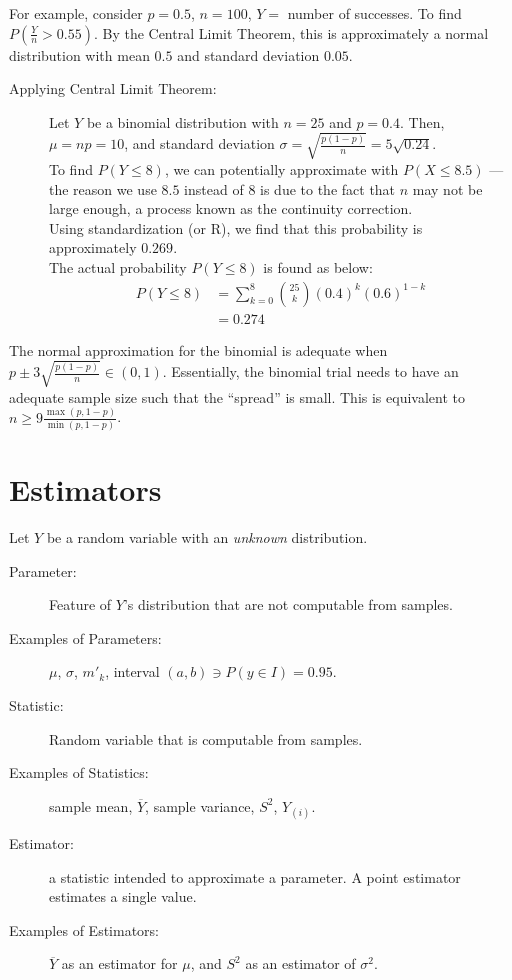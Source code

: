 \documentclass[10pt]{extarticle}
\begin{document}
    For example, consider $p=0.5$, $n=100$, $Y = $ number of successes. To find $P\left(\frac{Y}{n} > 0.55\right)$. By the Central Limit Theorem, this is approximately a normal distribution with mean $0.5$ and standard deviation $0.05$.
    \begin{description}
      \item[Applying Central Limit Theorem:] Let $Y$ be a binomial distribution with $n=25$ and $p=0.4$. Then, $\mu = np = 10$, and standard deviation $\sigma = \sqrt{\frac{p(1-p)}{n}} = 5\sqrt{0.24}$.\\

        To find $P(Y\leq 8)$, we can potentially approximate with $P(X\leq 8.5)$ --- the reason we use $8.5$ instead of $8$ is due to the fact that $n$ may not be large enough, a process known as the continuity correction.\\

        Using standardization (or R), we find that this probability is approximately $0.269$.\\

        The actual probability $P(Y\leq 8)$ is found as below:
        \begin{align*}
          P(Y\leq 8) &= \sum_{k=0}^{8} {25\choose k}(0.4)^k(0.6)^{1-k}\\
                     &= 0.274
        \end{align*}
    \end{description}
    The normal approximation for the binomial is adequate when $p \pm 3\sqrt{\frac{p(1-p)}{n}}\in (0,1)$. Essentially, the binomial trial needs to have an adequate sample size such that the ``spread'' is small. This is equivalent to $n \geq 9\frac{\max(p,1-p)}{\min(p,1-p)}$.
  \section{Estimators}%
  Let $Y$ be a random variable with an \textit{unknown} distribution.
  \begin{description}
    \item[Parameter:] Feature of $Y$'s distribution that are not computable from samples.
    \item[Examples of Parameters:] $\mu$, $\sigma$, $m'_k$, interval $(a,b) \ni P(y\in I) = 0.95$.
    \item[Statistic:] Random variable that is computable from samples.
    \item[Examples of Statistics:] sample mean, $\overline{Y}$, sample variance, $S^2$, $Y_{(i)}$.
    \item[Estimator:] a statistic intended to approximate a parameter. A point estimator estimates a single value.
    \item[Examples of Estimators:] $\overline{Y}$ as an estimator for $\mu$, and $S^2$ as an estimator of $\sigma^2$.
  \end{description}
\end{document}
